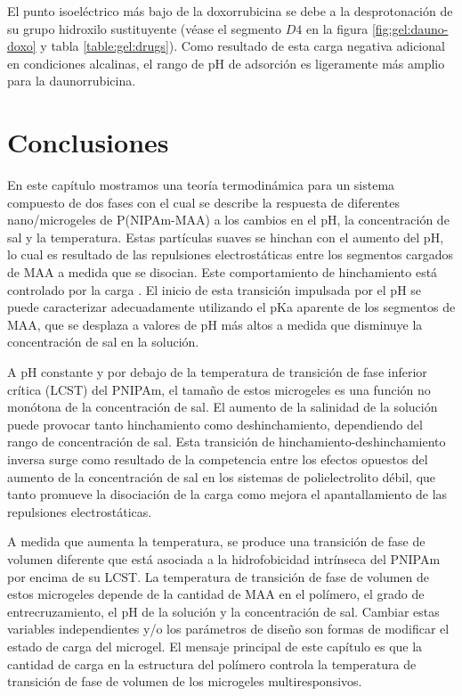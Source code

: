 El punto isoel\'ectrico m\'as bajo de la doxorrubicina se debe a la desprotonaci\'on de su grupo hidroxilo sustituyente (v\'ease  el segmento $D4$ en la figura \ref{fig:gel:dauno-doxo} y tabla \ref{table:gel:drugs}). Como resultado de esta carga negativa adicional en condiciones alcalinas, el rango de pH de adsorci\'on es ligeramente m\'as amplio para la daunorrubicina.

\section{Conclusiones}

En este cap\'itulo mostramos una teor\'ia termodin\'amica  para un sistema compuesto de dos fases con el cual se describe la respuesta de diferentes nano/microgeles de P(NIPAm-MAA) a los cambios en el pH, la concentraci\'on de sal y la temperatura.
Estas part\'iculas suaves se hinchan con el aumento del pH, lo cual es resultado de las repulsiones electrost\'aticas entre los segmentos cargados de MAA a medida que se disocian.
Este comportamiento de hinchamiento est\'a controlado por la carga \cite{FernandezNieves2000}.
El inicio de esta transici\'on impulsada por el pH se puede caracterizar adecuadamente utilizando el pKa aparente de los segmentos de MAA, que se desplaza a valores de pH m\'as altos a medida que disminuye la concentraci\'on de sal en la soluci\'on.

A pH constante y por debajo de la temperatura de transici\'on de fase inferior cr\'itica (LCST) del PNIPAm, el tama\~no de estos microgeles es una funci\'on no mon\'otona de la concentraci\'on de sal.
El aumento de la salinidad de la soluci\'on puede provocar tanto hinchamiento como deshinchamiento, dependiendo del rango de concentraci\'on de sal.
Esta transici\'on de hinchamiento-deshinchamiento inversa surge como resultado de la competencia entre los efectos opuestos del aumento de la concentraci\'on de sal en los sistemas de polielectrolito d\'ebil, que tanto promueve la disociaci\'on de la carga como mejora el apantallamiento de las repulsiones electrost\'aticas.


A medida que aumenta la temperatura, se produce una transici\'on de fase de volumen diferente que est\'a asociada a la hidrofobicidad intr\'inseca del PNIPAm por encima de su LCST.
La temperatura de transici\'on de fase de volumen de estos microgeles depende de la cantidad de MAA en el pol\'imero, el grado de entrecruzamiento, el pH de la soluci\'on y la concentraci\'on de sal.
Cambiar estas variables independientes y/o los par\'ametros de dise\~no son formas de modificar el estado de carga del microgel.
El mensaje principal de este cap\'itulo es que la cantidad de carga en la estructura del pol\'imero controla la temperatura de transici\'on de fase de volumen de los microgeles multiresponsivos.

